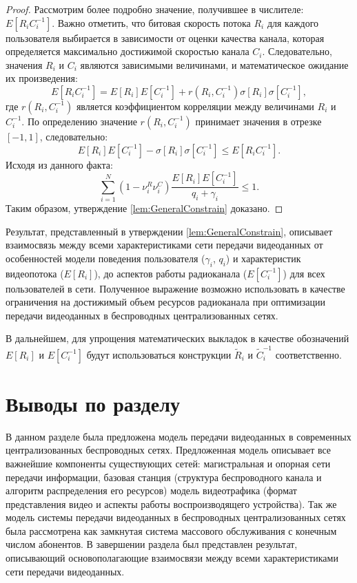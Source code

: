 \begin{proof}
Рассмотрим более подробно значение, получившее в числителе: $E\left[R_{i}C_{i}^{-1}\right]$. Важно отметить, что битовая скорость потока $R_i$ для каждого пользователя выбирается в зависимости от оценки качества канала, которая определяется максимально достижимой скоростью канала $C_i$. Следовательно, значения $R_i$ и $C_i$ являются зависимыми величинами, и математическое ожидание их произведения:
\begin{equation}
	\nonumber
	E\left[R_{i}C_{i}^{-1}\right] = E\left[R_{i}\right]E\left[C_{i}^{-1}\right] + r \left(R_i, C_{i}^{-1}\right) \sigma[R_i]\sigma[C_i^{-1}],
\end{equation}
где $r \left(R_i, C_{i}^{-1}\right)$ является коэффициентом корреляции между величинами $R_i$ и $C_{i}^{-1}$. По определению значение $r \left(R_i, C_{i}^{-1}\right)$ принимает значения в отрезке $[-1, 1]$, следовательно:
\begin{equation}
	\nonumber
	 E\left[R_{i}\right]E\left[C_{i}^{-1}\right] - \sigma[R_i]\sigma[C_i^{-1}] \leq E\left[R_{i}C_{i}^{-1}\right].
\end{equation}
Исходя из данного факта:
\begin{equation}
	\nonumber
	\sum\limits_{i=1}^{N} {\left(1-\nu^R_i\nu^C_i\right)\frac{E[R_i]E[C_i^{-1}]}{q_i + \gamma_i}} \leq 1.
\end{equation}
Таким образом, утверждение \ref{lem:GeneralConstrain} доказано.
\end{proof}

Результат, представленный в утверждении \ref{lem:GeneralConstrain}, описывает взаимосвязь между всеми характеристиками сети передачи видеоданных от особенностей модели поведения пользователя ($\gamma_i$, $q_i$) и характеристик видеопотока ($E[R_i]$), до аспектов работы радиоканала ($E[C_i^{-1}]$) для всех пользователей в сети. Полученное выражение возможно использовать в качестве ограничения на достижимый объем ресурсов радиоканала при оптимизации передачи видеоданных в беспроводных централизованных сетях.

В дальнейшем, для упрощения математических выкладок в качестве обозначений $E[R_i]$ и $E[C^{-1}_i]$ будут использоваться конструкции $\tilde{R}_i$ и $\tilde{C}^{-1}_i$ соответственно.

\section{Выводы по разделу}

В данном разделе была предложена модель передачи видеоданных в современных централизованных беспроводных сетях. Предложенная модель описывает все важнейшие компоненты существующих сетей: магистральная и опорная сети передачи информации, базовая станция (структура беспроводного канала и алгоритм распределения его ресурсов) модель видеотрафика (формат представления видео и аспекты работы воспроизводящего устройства). Так же модель системы передачи видеоданных в беспроводных централизованных сетях была рассмотрена как замкнутая система массового обслуживания с конечным числом абонентов. В завершении раздела был представлен результат, описывающий основополагающие взаимосвязи между всеми характеристиками сети передачи видеоданных.

